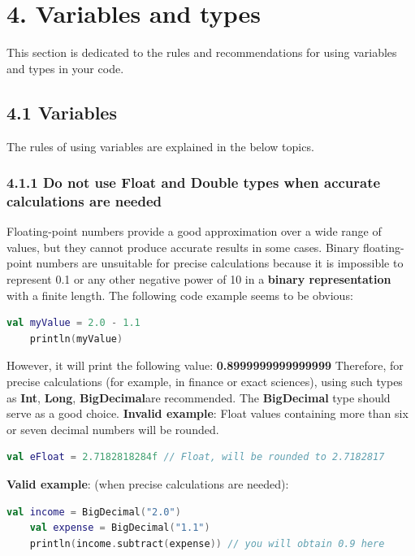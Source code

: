 \section*{\textbf{4. Variables and types}}
\label{sec:4.}
This section is dedicated to the rules and recommendations for using variables and types in your code.
\subsection*{\textbf{4.1 Variables}}
\label{sec:4.1}
The rules of using variables are explained in the below topics.
\subsubsection*{\textbf{4.1.1 Do not use Float and Double types when accurate calculations are needed}}
\leavevmode\newline
\label{sec:4.1.1}
Floating-point numbers provide a good approximation over a wide range of values, but they cannot produce accurate results in some cases.
Binary floating-point numbers are unsuitable for precise calculations because it is impossible to represent 0.1 or any other negative power of 10 in a \textbf{binary representation} with a finite length.
The following code example seems to be obvious: 
\begin{lstlisting}[language=Kotlin]
    val myValue = 2.0 - 1.1
    println(myValue)
\end{lstlisting}
However, it will print the following value: \textbf{0.8999999999999999}
Therefore, for precise calculations (for example, in finance or exact sciences), using such types as \textbf{Int}, \textbf{Long}, \textbf{BigDecimal}are recommended.
The \textbf{BigDecimal} type should serve as a good choice.
\textbf{Invalid example}:
Float values containing more than six or seven decimal numbers will be rounded.
\begin{lstlisting}[language=Kotlin]
 val eFloat = 2.7182818284f // Float, will be rounded to 2.7182817
\end{lstlisting}
\textbf{Valid example}: (when precise calculations are needed): 
\begin{lstlisting}[language=Kotlin]
    val income = BigDecimal("2.0")
    val expense = BigDecimal("1.1")
    println(income.subtract(expense)) // you will obtain 0.9 here
\end{lstlisting}
